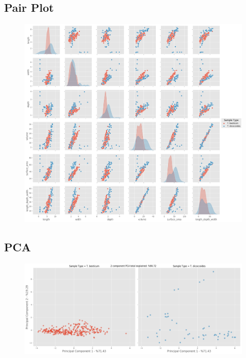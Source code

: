 \documentclass[11pt]{report}
\begin{document}
\subsection{Pair Plot}
\label{sec:orgbd5c284}

\begin{figure}[htbp]
\centering
\includegraphics[width=18cm]{./images/results/group4/pairplot.png}
\label{fig:org1057ece}
\end{figure}

\clearpage
\subsection{PCA}
\label{sec:orgbc192cd}
\begin{figure}[htbp]
\centering
\includegraphics[width=18cm]{./images/results/group4/pca.png}
\label{fig:org4cc02fd}
\end{figure}
\end{document}
